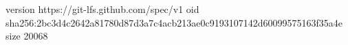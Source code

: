 version https://git-lfs.github.com/spec/v1
oid sha256:2bc3d4c2642a81780d87d3a7c4acb213ae0c9193107142d60099575163f35a4e
size 20068
